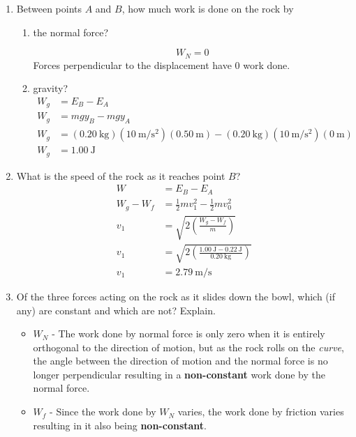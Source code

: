 \documentclass{article}
\begin{document}
\begin{enumerate}[label = \textbf{(\alph*)}]
	\item Between points $ A $ and $ B $, how much work is done on the rock by
		\begin{enumerate}[label = \textbf{(\roman*)}]
			\item the normal force?
				\begin{mdframed}
					$$ W_N = 0 $$
					Forces perpendicular to the displacement have 0 work done.
				\end{mdframed}
			\item gravity?
				\begin{align*}
					W_g & = E_B - E_A \\
					W_g & = mgy_B - mgy_A \\
					W_g & = (\SI{0.20}{\kilogram})(\SI{10}{\meter \per \second \squared})(\SI{0.50}{\meter}) - (\SI{0.20}{\kilogram})(\SI{10}{\meter \per \second \squared})(\SI{0}{\meter}) \\
					W_g & = \SI{1.00}{\joule}
				\end{align*}
		\end{enumerate}
	\item What is the speed of the rock as it reaches point $ B $?
		\begin{align*}
			W & = E_B - E_A \\
			W_g - W_f & = \frac{1}{2}mv_1^2 - \frac{1}{2}mv_0^2 \\
			v_1 & = \sqrt{ 2 \left( \frac{W_g - W_f}{m} \right) } \\
			v_1 & = \sqrt{ 2 \left( \frac{\SI{1.00}{\joule} - \SI{0.22}{\joule}}{\SI{0.20}{\kilogram}} \right) } \\
			v_1 & = \SI{2.79}{\meter \per \second}
		\end{align*}
	\item Of the three forces acting on the rock as it slides down the bowl, which (if any) are constant and which are not? Explain.
		\begin{itemize}
			\item $ W_N $ - The work done by normal force is only zero when it is entirely orthogonal to the direction of motion, but as the rock rolls on the \textit{curve}, the angle between the direction of motion and the normal force is no longer perpendicular resulting in a \textbf{non-constant} work done by the normal force.
			\item $ W_f $ - Since the work done by $ W_N $ varies, the work done by friction varies resulting in it also being \textbf{non-constant}.

\end{itemize}
\end{enumerate}
\end{document}
